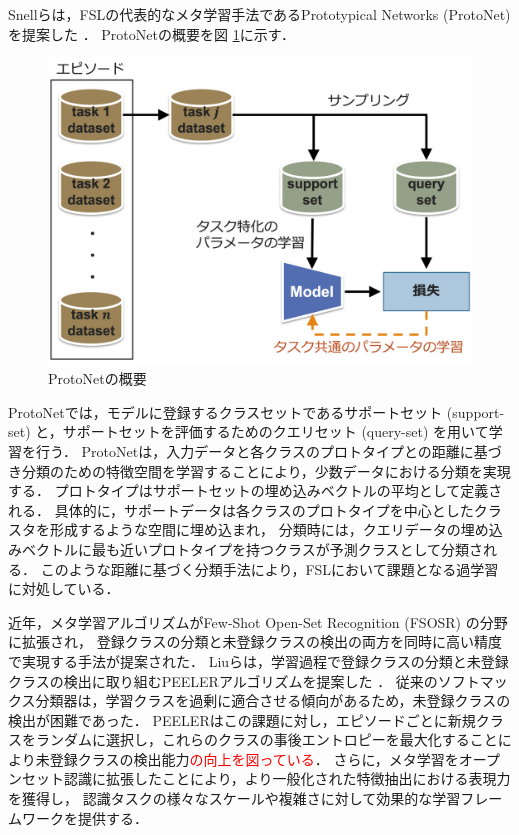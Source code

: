 \documentclass[a4paper,11pt,nomag]{jsreport}
\begin{document}
Snellらは，FSLの代表的なメタ学習手法であるPrototypical Networks (ProtoNet) を提案した \cite{protonet}．
ProtoNetの概要を図 \ref{fig:protonet}に示す．
% 
\begin{figure}[tbp]
  \centering
  \includegraphics[width=0.7\linewidth, keepaspectratio]{image/protonet.png}
  \caption{ProtoNetの概要}
  \label{fig:protonet}
\end{figure}
% 
ProtoNetでは，モデルに登録するクラスセットであるサポートセット (support-set) と，サポートセットを評価するためのクエリセット (query-set) を用いて学習を行う．
ProtoNetは，入力データと各クラスのプロトタイプとの距離に基づき分類のための特徴空間を学習することにより，少数データにおける分類を実現する．
プロトタイプはサポートセットの埋め込みベクトルの平均として定義される．
具体的に，サポートデータは各クラスのプロトタイプを中心としたクラスタを形成するような空間に埋め込まれ，
分類時には，クエリデータの埋め込みベクトルに最も近いプロトタイプを持つクラスが予測クラスとして分類される．
このような距離に基づく分類手法により，FSLにおいて課題となる過学習に対処している．

近年，メタ学習アルゴリズムがFew-Shot Open-Set Recognition (FSOSR) の分野に拡張され，
登録クラスの分類と未登録クラスの検出の両方を同時に高い精度で実現する手法が提案された．
Liuらは，学習過程で登録クラスの分類と未登録クラスの検出に取り組むPEELERアルゴリズムを提案した \cite{peeler}．
従来のソフトマックス分類器は，学習クラスを過剰に適合させる傾向があるため，未登録クラスの検出が困難であった．
PEELERはこの課題に対し，エピソードごとに新規クラスをランダムに選択し，これらのクラスの事後エントロピーを最大化することにより未登録クラスの検出能力\textcolor{red}{の向上を図っている}．
さらに，メタ学習をオープンセット認識に拡張したことにより，より一般化された特徴抽出における表現力を獲得し，
認識タスクの様々なスケールや複雑さに対して効果的な学習フレームワークを提供する．
\end{document}

